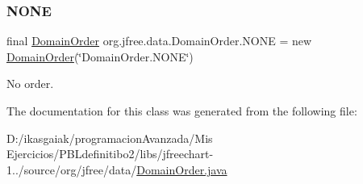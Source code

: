 \subsubsection{\texorpdfstring{N\+O\+NE}{NONE}}
{\footnotesize\ttfamily final \mbox{\hyperlink{classorg_1_1jfree_1_1data_1_1_domain_order}{Domain\+Order}} org.\+jfree.\+data.\+Domain\+Order.\+N\+O\+NE = new \mbox{\hyperlink{classorg_1_1jfree_1_1data_1_1_domain_order}{Domain\+Order}}(\char`\"{}Domain\+Order.\+N\+O\+NE\char`\"{})\hspace{0.3cm}{\ttfamily [static]}}

No order. 

The documentation for this class was generated from the following file\+:\begin{DoxyCompactItemize}
\item 
D\+:/ikasgaiak/programacion\+Avanzada/\+Mis Ejercicios/\+P\+B\+Ldefinitibo2/libs/jfreechart-\/1../source/org/jfree/data/\mbox{\hyperlink{_domain_order_8java}{Domain\+Order.\+java}}\end{DoxyCompactItemize}
